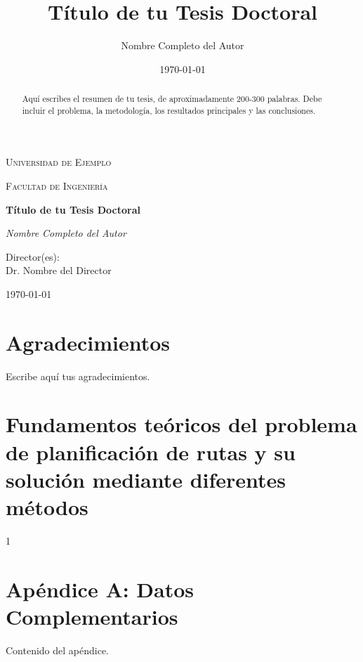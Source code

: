 \documentclass[12pt, a4paper, oneside]{report}
\title{Título de tu Tesis Doctoral}
\author{Nombre Completo del Autor}
\date{\today} %
\begin{document}
\begin{titlepage}
    \centering
    {\scshape\LARGE Universidad de Ejemplo \par}
    \vspace{1cm}
    {\scshape\Large Facultad de Ingeniería \par}
    \vspace{1.5cm}
    {\huge\bfseries Título de tu Tesis Doctoral \par}
    \vspace{2cm}
    {\Large\itshape Nombre Completo del Autor \par}
    \vfill
    Director(es): \\ Dr. Nombre del Director
    \vfill
    {\large \today \par}
\end{titlepage}

\begin{abstract}
    Aquí escribes el resumen de tu tesis, de aproximadamente 200-300 palabras.
    Debe incluir el problema, la metodología, los resultados principales y las
    conclusiones.
\end{abstract}

\chapter*{Agradecimientos}
Escribe aquí tus agradecimientos.


\tableofcontents
\listoffigures
\listoftables




\chapter{Fundamentos teóricos del problema de planificación de rutas y su solución mediante diferentes métodos}{1}



\printbibliography[heading=bibintoc, title={Referencias Bibliograficas}]

\appendix
\chapter{Apéndice A: Datos Complementarios}
Contenido del apéndice.
\end{document}
